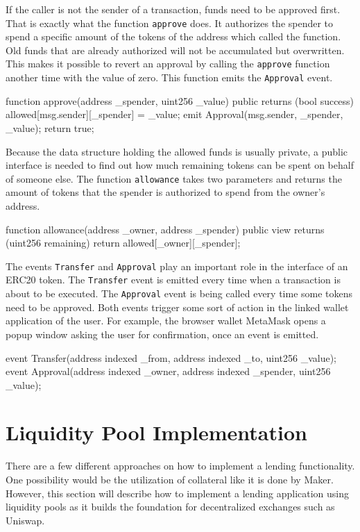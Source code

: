 If the caller is not the sender of a transaction, funds need to be approved first. That is exactly what the function \texttt{approve} does. It authorizes the spender to spend a specific amount of the tokens of the address which called the function. Old funds that are already authorized will not be accumulated but overwritten. This makes it possible to revert an approval by calling the \texttt{approve} function another time with the value of zero. This function emits the \texttt{Approval} event.
\begin{GenericCode}
function approve(address _spender, uint256 _value) public returns (bool success) {
  allowed[msg.sender][_spender] = _value;
  emit Approval(msg.sender, _spender, _value);
  return true;
}
\end{GenericCode}

Because the data structure holding the allowed funds is usually private, a public interface is needed to find out how much remaining tokens can be spent on behalf of someone else. The function \texttt{allowance} takes two parameters and returns the amount of tokens that the spender is authorized to spend from the owner's address.
\begin{GenericCode}
function allowance(address _owner, address _spender) public view returns (uint256 remaining) {
  return allowed[_owner][_spender];
}
\end{GenericCode}

The events \texttt{Transfer} and \texttt{Approval} play an important role in the interface of an ERC20 token. The \texttt{Transfer} event is emitted every time when a transaction is about to be executed. The \texttt{Approval} event is being called every time some tokens need to be approved. Both events trigger some sort of action in the linked wallet application of the user. For example, the browser wallet MetaMask opens a popup window asking the user for confirmation, once an event is emitted. 
\begin{GenericCode}
event Transfer(address indexed _from, address indexed _to, uint256 _value);
event Approval(address indexed _owner, address indexed _spender, uint256 _value);
\end{GenericCode}

\section{Liquidity Pool Implementation}
There are a few different approaches on how to implement a lending functionality. One possibility would be the utilization of collateral like it is
done by Maker\cite{MakerDAO2021}. However, this section will describe how to implement a lending application using liquidity pools as it builds the
foundation for decentralized exchanges such as Uniswap\cite{Uniswap2020}.

